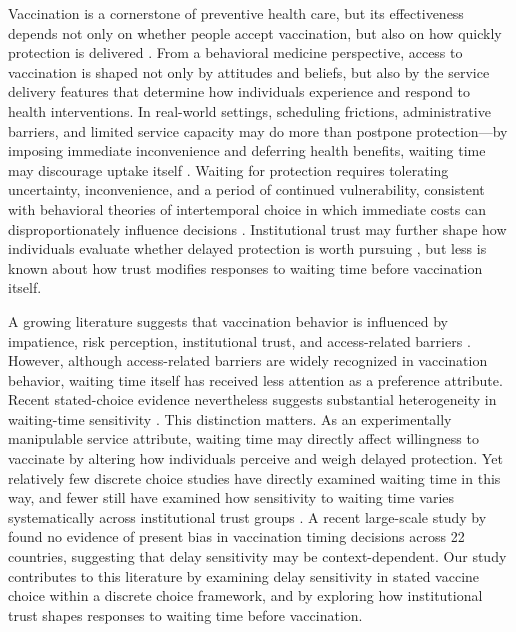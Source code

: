 \documentclass[12pt]{article}
\begin{document}
Vaccination is a cornerstone of preventive health care, but its effectiveness depends not only on whether people accept vaccination, but also on how quickly protection is delivered \parencite{Anderson2023}. From a behavioral medicine perspective, access to vaccination is shaped not only by attitudes and beliefs, but also by the service delivery features that determine how individuals experience and respond to health interventions. In real-world settings, scheduling frictions, administrative barriers, and limited service capacity may do more than postpone protection---by imposing immediate inconvenience and deferring health benefits, waiting time may discourage uptake itself \parencite{Cantarelli2024AdministrativeBurdens,LiuEtAl2024}. Waiting for protection requires tolerating uncertainty, inconvenience, and a period of continued vulnerability, consistent with behavioral theories of intertemporal choice in which immediate costs can disproportionately influence decisions \parencite{Laibson1997,ODonoghueRabin1999}. Institutional trust may further shape how individuals evaluate whether delayed protection is worth pursuing \parencite{Ahmad2022TrustVaccination,Truong2022VaccineHesitancyAcceptance}, but less is known about how trust modifies responses to waiting time before vaccination itself.

A growing literature suggests that vaccination behavior is influenced by impatience, risk perception, institutional trust, and access-related barriers \parencite{Anderson2023,Robertson2024,Etowa2024,Baldwin2023}. However, although access-related barriers are widely recognized in vaccination behavior, waiting time itself has received less attention as a preference attribute. Recent stated-choice evidence nevertheless suggests substantial heterogeneity in waiting-time sensitivity \parencite{Tran2025}. This distinction matters. As an experimentally manipulable service attribute, waiting time may directly affect willingness to vaccinate by altering how individuals perceive and weigh delayed protection. Yet relatively few discrete choice studies have directly examined waiting time in this way, and fewer still have examined how sensitivity to waiting time varies systematically across institutional trust groups \parencite{Yue2021,Gong2020,vanderPol2001}. A recent large-scale study by \textcite{Attema2025} found no evidence of present bias in vaccination timing decisions across 22 countries, suggesting that delay sensitivity may be context-dependent. Our study contributes to this literature by examining delay sensitivity in stated vaccine choice within a discrete choice framework, and by exploring how institutional trust shapes responses to waiting time before vaccination.
\end{document}
